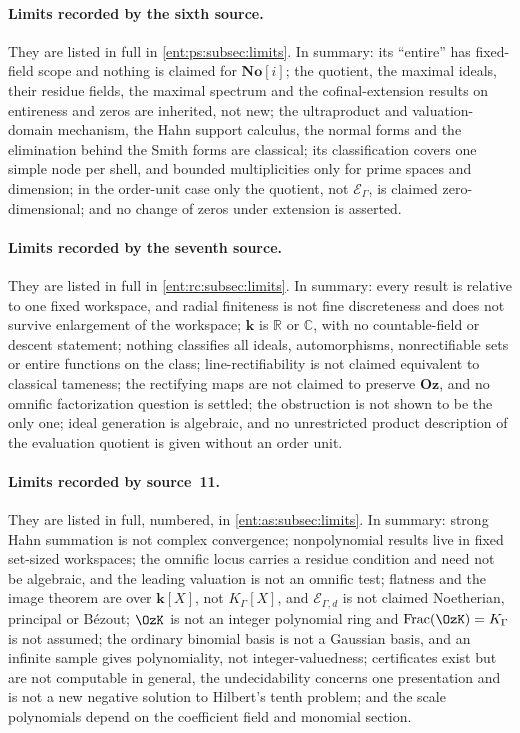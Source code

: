 \documentclass[11pt]{article}
\theoremstyle{plain}
\theoremstyle{plain}
\theoremstyle{plain}
\theoremstyle{definition}
\theoremstyle{definition}
\theoremstyle{definition}
\theoremstyle{definition}
\theoremstyle{remark}
\newcommand{\C}{\mathbb C}\newcommand{\R}{\mathbb R}
\newcommand{\No}{\mathbf{No}}
\newcommand{\K}{K_\Gamma}\newcommand{\KD}{K_\Delta}
\newcommand{\E}{\mathcal E_\Gamma}
\newcommand{\kk}{\mathbf k}\newcommand{\PP}{\mathbb P}
\newcommand{\Oz}{\mathbf{Oz}}\newcommand{\Ed}{\mathcal E_{\Gamma,d}}
\begin{document}
\paragraph{Limits recorded by the sixth source.}
They are listed in full in \cref{ent:ps:subsec:limits}. In summary: its
``entire'' has fixed-field scope and nothing is claimed for $\No[i]$; the
quotient, the maximal ideals, their residue fields, the maximal spectrum and
the cofinal-extension results on entireness and zeros are inherited, not new;
the ultraproduct and valuation-domain mechanism, the Hahn support calculus,
the normal forms and the elimination behind the Smith forms are classical;
its classification covers one simple node per shell, and bounded
multiplicities only for prime spaces and dimension; in the order-unit case
only the quotient, not $\E$, is claimed zero-dimensional; and no change of
zeros under extension is asserted.

\paragraph{Limits recorded by the seventh source.}
They are listed in full in \cref{ent:rc:subsec:limits}. In summary: every
result is relative to one fixed workspace, and radial finiteness is not fine
discreteness and does not survive enlargement of the workspace; $\kk$ is $\R$
or $\C$, with no countable-field or descent statement; nothing classifies all
ideals, automorphisms, nonrectifiable sets or entire functions on the class;
line-rectifiability is not claimed equivalent to classical tameness; the
rectifying maps are not claimed to preserve $\Oz$, and no omnific
factorization question is settled; the obstruction is not shown to be the
only one; ideal generation is algebraic, and no unrestricted product
description of the evaluation quotient is given without an order unit.

\paragraph{Limits recorded by source~11.}
They are listed in full, numbered, in \cref{ent:as:subsec:limits}. In summary:
strong Hahn summation is not complex convergence; nonpolynomial results live
in fixed set-sized workspaces; the omnific locus carries a residue condition
and need not be algebraic, and the leading valuation is not an omnific test;
flatness and the image theorem are over $\kk[X]$, not $\K[X]$, and $\Ed$ is
not claimed Noetherian, principal or B\'ezout; $\OzK$ is not an integer
polynomial ring and $\operatorname{Frac}(\OzK)=\K$ is not assumed; the ordinary
binomial basis is not a Gaussian basis, and an infinite sample gives
polynomiality, not integer-valuedness; certificates exist but are not computable
in general, the undecidability concerns one presentation and is not a new
negative solution to Hilbert's tenth problem; and the scale polynomials depend
on the coefficient field and monomial section.
\end{document}
